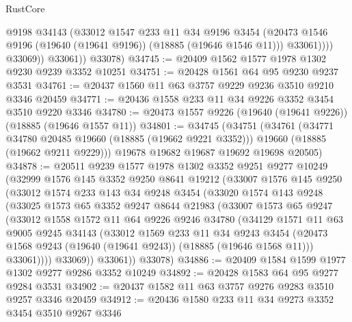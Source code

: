 \begin{lexlean}{RustCore}
\begin{coremodule}
                    @9198
                    @34143
                    (@33012
                      @1547
                      @233
                      @11
                      @34
                      @9196
                      @3454
                      (@20473 @1546 @9196 (@19640 (@19641 @9196)) (@18885 (@19646 @1546 @11)))
                      @33061))))
              @33069))
          @33061))
      @33078)
@34745 := @20409 @1562 @1577 @1978 @1302 @9230 @9239 @3352 @10251
@34751 := @20428 @1561 @64 @95 @9230 @9237 @3531
@34761 := @20437 @1560 @11 @63 @3757 @9229 @9236 @3510 @9210 @3346 @20459
@34771 := @20436 @1558 @233 @11 @34 @9226 @3352 @3454 @3510 @9220 @3346
@34780 := @20473 @1557 @9226 (@19640 (@19641 @9226)) (@18885 (@19646 @1557 @11))
@34801 := @34745
    (@34751
      (@34761
        (@34771 @34780 @20485 @19660 (@18885 (@19662 @9221 @3352)))
        @19660
        (@18885 (@19662 @9211 @9229)))
      @19678
      @19682
      @19687
      @19692
      @19698
      @20505)
@34878 := @20511
    @9239
    @1577
    @1978
    @1302
    @3352
    @9251
    @9277
    @10249
    (@32999
      @1576
      @145
      @3352
      @9250
      @8641
      @19212
      (@33007
        @1576
        @145
        @9250
        (@33012
          @1574
          @233
          @143
          @34
          @9248
          @3454
          (@33020
            @1574
            @143
            @9248
            (@33025
              @1573
              @65
              @3352
              @9247
              @8644
              @21983
              (@33007
                @1573
                @65
                @9247
                (@33012
                  @1558
                  @1572
                  @11
                  @64
                  @9226
                  @9246
                  @34780
                  (@34129
                    @1571
                    @11
                    @63
                    @9005
                    @9245
                    @34143
                    (@33012
                      @1569
                      @233
                      @11
                      @34
                      @9243
                      @3454
                      (@20473 @1568 @9243 (@19640 (@19641 @9243)) (@18885 (@19646 @1568 @11)))
                      @33061))))
              @33069))
          @33061))
      @33078)
@34886 := @20409 @1584 @1599 @1977 @1302 @9277 @9286 @3352 @10249
@34892 := @20428 @1583 @64 @95 @9277 @9284 @3531
@34902 := @20437 @1582 @11 @63 @3757 @9276 @9283 @3510 @9257 @3346 @20459
@34912 := @20436 @1580 @233 @11 @34 @9273 @3352 @3454 @3510 @9267 @3346

\end{coremodule}
\end{lexlean}
